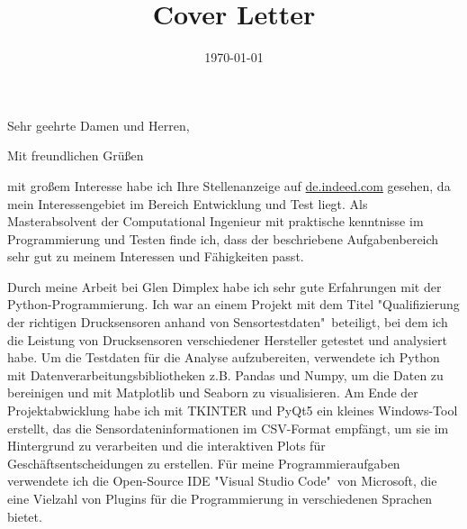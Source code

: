 \documentclass[11.5pt,a4paper,sans]{moderncv}
\title{Cover Letter}                               %
\begin{document}
\subject{\small Bewerbung als Webentwicklerin }
\date{\small \today}

\opening{\vspace{-1mm} \small Sehr geehrte Damen und Herren,} %
\closing{\vspace{1mm} \small Mit freundlichen Grüßen \\ %
\vspace{-14mm}}
\makelettertitle
\vspace*{-8mm}
\justify
	mit großem Interesse habe ich Ihre Stellenanzeige auf \underline{de.indeed.com} gesehen, da mein Interessengebiet im Bereich Entwicklung und Test liegt. Als Masterabsolvent der Computational Ingenieur mit praktische kenntnisse im Programmierung und Testen finde ich, dass der beschriebene Aufgabenbereich sehr gut zu meinem Interessen und Fähigkeiten passt.
        
Durch meine Arbeit bei Glen Dimplex habe ich sehr gute Erfahrungen mit der Python-Programmierung. Ich war an einem Projekt mit dem Titel "Qualifizierung der richtigen Drucksensoren anhand von Sensortestdaten"\ beteiligt, bei dem ich die Leistung von Drucksensoren verschiedener Hersteller getestet und analysiert habe. Um die Testdaten für die Analyse aufzubereiten, verwendete ich Python mit Datenverarbeitungsbibliotheken z.B. Pandas und Numpy, um die Daten zu bereinigen und mit Matplotlib und Seaborn zu visualisieren. Am Ende der Projektabwicklung habe ich mit TKINTER und PyQt5 ein kleines Windows-Tool erstellt, das die Sensordateninformationen im CSV-Format empfängt, um sie im Hintergrund zu verarbeiten und die interaktiven Plots für Geschäftsentscheidungen zu erstellen. Für meine Programmieraufgaben verwendete ich die Open-Source IDE "Visual Studio Code"\ von Microsoft, die eine Vielzahl von Plugins für die Programmierung in verschiedenen Sprachen bietet. 
\end{document}

